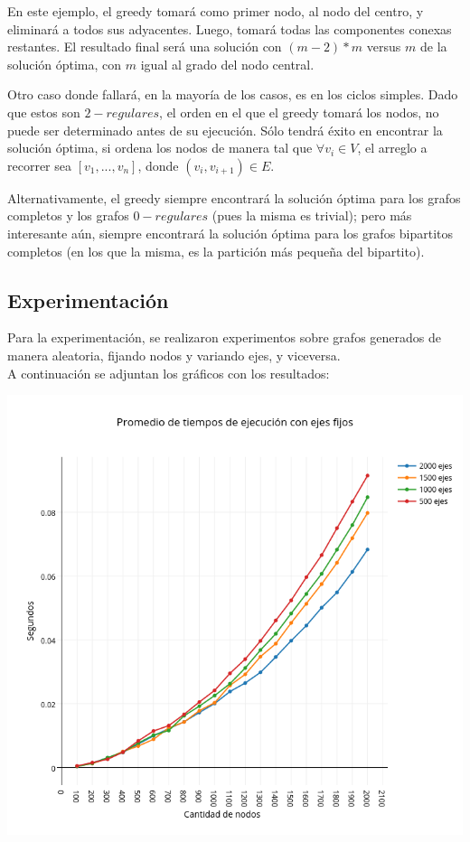 En este ejemplo, el greedy tomará como primer nodo, al nodo del centro, y eliminará a todos sus adyacentes. Luego, tomará todas las componentes conexas restantes.
El resultado final será una solución con $(m-2)*m$ versus $m$ de la solución óptima, con $m$ igual al grado del nodo central.

Otro caso donde fallará, en la mayoría de los casos, es en los ciclos simples. Dado que estos son $2-regulares$, el orden en el que el greedy tomará los nodos, no puede ser determinado antes de su ejecución. Sólo tendrá éxito en encontrar la solución óptima, si ordena los nodos de manera tal que $\forall v_{i} \in V$, el arreglo a recorrer sea $[v_{1},...,v_{n}]$, donde $(v_{i},v_{i+1}) \in E$.

Alternativamente, el greedy siempre encontrará la solución óptima para los grafos completos y los grafos $0-regulares$ (pues la misma es trivial); pero más interesante aún, siempre encontrará la solución óptima para los grafos bipartitos completos (en los que la misma, es la partición más pequeña del bipartito).

\newpage
\subsection{Experimentaci\'on}
Para la experimentación, se realizaron experimentos sobre grafos generados de manera aleatoria, fijando nodos y variando ejes, y viceversa.\\

A continuación se adjuntan los gráficos con los resultados:

\includegraphics[width=15cm,keepaspectratio=yes]{imagenes/greedy/fixedge.png}

